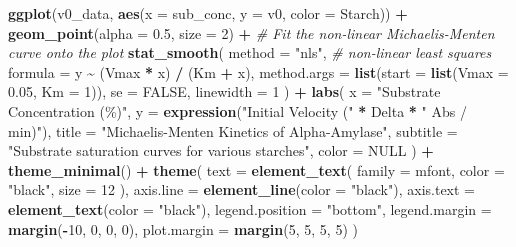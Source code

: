 \documentclass[
  12pt,
]{article}
\newenvironment{Shaded}{\begin{snugshade}}{\end{snugshade}}
\newcommand{\AttributeTok}[1]{\textcolor[rgb]{0.13,0.29,0.53}{#1}}
\newcommand{\CommentTok}[1]{\textcolor[rgb]{0.56,0.35,0.01}{\textit{#1}}}
\newcommand{\ConstantTok}[1]{\textcolor[rgb]{0.56,0.35,0.01}{#1}}
\newcommand{\DecValTok}[1]{\textcolor[rgb]{0.00,0.00,0.81}{#1}}
\newcommand{\FloatTok}[1]{\textcolor[rgb]{0.00,0.00,0.81}{#1}}
\newcommand{\FunctionTok}[1]{\textcolor[rgb]{0.13,0.29,0.53}{\textbf{#1}}}
\newcommand{\NormalTok}[1]{#1}
\newcommand{\SpecialCharTok}[1]{\textcolor[rgb]{0.81,0.36,0.00}{\textbf{#1}}}
\newcommand{\StringTok}[1]{\textcolor[rgb]{0.31,0.60,0.02}{#1}}
\begin{document}
\begin{Shaded}
\begin{Highlighting}[]
\FunctionTok{ggplot}\NormalTok{(v0\_data, }\FunctionTok{aes}\NormalTok{(}\AttributeTok{x =}\NormalTok{ sub\_conc, }\AttributeTok{y =}\NormalTok{ v0, }\AttributeTok{color =}\NormalTok{ Starch)) }\SpecialCharTok{+}
  \FunctionTok{geom\_point}\NormalTok{(}\AttributeTok{alpha =} \FloatTok{0.5}\NormalTok{, }\AttributeTok{size =} \DecValTok{2}\NormalTok{) }\SpecialCharTok{+}
  \CommentTok{\# Fit the non{-}linear Michaelis{-}Menten curve onto the plot}
  \FunctionTok{stat\_smooth}\NormalTok{(}
    \AttributeTok{method =} \StringTok{"nls"}\NormalTok{, }\CommentTok{\# non{-}linear least squares}
    \AttributeTok{formula =}\NormalTok{ y }\SpecialCharTok{\textasciitilde{}}\NormalTok{ (Vmax }\SpecialCharTok{*}\NormalTok{ x) }\SpecialCharTok{/}\NormalTok{ (Km }\SpecialCharTok{+}\NormalTok{ x),}
    \AttributeTok{method.args =} \FunctionTok{list}\NormalTok{(}\AttributeTok{start =} \FunctionTok{list}\NormalTok{(}\AttributeTok{Vmax =} \FloatTok{0.05}\NormalTok{, }\AttributeTok{Km =} \DecValTok{1}\NormalTok{)),}
    \AttributeTok{se =} \ConstantTok{FALSE}\NormalTok{,}
    \AttributeTok{linewidth =} \DecValTok{1}
\NormalTok{  ) }\SpecialCharTok{+}
  \FunctionTok{labs}\NormalTok{(}
    \AttributeTok{x =} \StringTok{"Substrate Concentration (\%)"}\NormalTok{,}
    \AttributeTok{y =} \FunctionTok{expression}\NormalTok{(}\StringTok{"Initial Velocity ("} \SpecialCharTok{*}\NormalTok{ Delta }\SpecialCharTok{*} \StringTok{" Abs / min)"}\NormalTok{),}
    \AttributeTok{title =} \StringTok{"Michaelis{-}Menten Kinetics of Alpha{-}Amylase"}\NormalTok{,}
    \AttributeTok{subtitle =} \StringTok{"Substrate saturation curves for various starches"}\NormalTok{,}
    \AttributeTok{color =} \ConstantTok{NULL}
\NormalTok{  ) }\SpecialCharTok{+}
  \FunctionTok{theme\_minimal}\NormalTok{() }\SpecialCharTok{+}
  \FunctionTok{theme}\NormalTok{(}
    \AttributeTok{text =} \FunctionTok{element\_text}\NormalTok{(}
      \AttributeTok{family =}\NormalTok{ mfont,}
      \AttributeTok{color =} \StringTok{"black"}\NormalTok{,}
      \AttributeTok{size =} \DecValTok{12}
\NormalTok{      ),}
    \AttributeTok{axis.line =} \FunctionTok{element\_line}\NormalTok{(}\AttributeTok{color =} \StringTok{"black"}\NormalTok{),}
    \AttributeTok{axis.text =} \FunctionTok{element\_text}\NormalTok{(}\AttributeTok{color =} \StringTok{"black"}\NormalTok{),}
    \AttributeTok{legend.position =} \StringTok{"bottom"}\NormalTok{,}
    \AttributeTok{legend.margin =} \FunctionTok{margin}\NormalTok{(}\SpecialCharTok{{-}}\DecValTok{10}\NormalTok{, }\DecValTok{0}\NormalTok{, }\DecValTok{0}\NormalTok{, }\DecValTok{0}\NormalTok{),}
    \AttributeTok{plot.margin =} \FunctionTok{margin}\NormalTok{(}\DecValTok{5}\NormalTok{, }\DecValTok{5}\NormalTok{, }\DecValTok{5}\NormalTok{, }\DecValTok{5}\NormalTok{)}
\NormalTok{)}
\end{Highlighting}
\end{Shaded}
\end{document}
